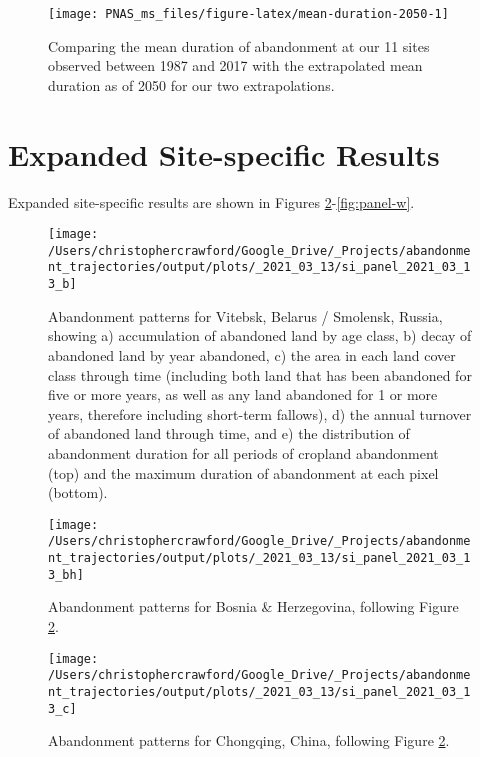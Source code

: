\documentclass[9pt,twocolumn,twoside,lineno]{pnas-new}
\begin{document}
\begin{figure}
\texttt{[image: PNAS\_ms\_files/figure-latex/mean-duration-2050-1]} \caption{Comparing the mean duration of abandonment at our 11 sites observed between 1987 and 2017 with the extrapolated mean duration as of 2050 for our two extrapolations.}\label{fig:mean-duration-2050}
\end{figure}

\hypertarget{expanded-site-specific-results}{%
\section{Expanded Site-specific Results}\label{expanded-site-specific-results}}

Expanded site-specific results are shown in Figures \ref{fig:panel-b}-\ref{fig:panel-w}.













\begin{figure}
\texttt{[image: /Users/christophercrawford/Google\_Drive/\_Projects/abandonment\_trajectories/output/plots/\_2021\_03\_13/si\_panel\_2021\_03\_13\_b]} \caption{Abandonment patterns for Vitebsk, Belarus / Smolensk, Russia, showing a) accumulation of abandoned land by age class, b) decay of abandoned land by year abandoned, c) the area in each land cover class through time (including both land that has been abandoned for five or more years, as well as any land abandoned for 1 or more years, therefore including short-term fallows), d) the annual turnover of abandoned land through time, and e) the distribution of abandonment duration for all periods of cropland abandonment (top) and the maximum duration of abandonment at each pixel (bottom).}\label{fig:panel-b}
\end{figure}

\begin{figure}
\texttt{[image: /Users/christophercrawford/Google\_Drive/\_Projects/abandonment\_trajectories/output/plots/\_2021\_03\_13/si\_panel\_2021\_03\_13\_bh]} \caption{Abandonment patterns for Bosnia \& Herzegovina, following Figure \ref{fig:panel-b}.}\label{fig:panel-bh}
\end{figure}

\begin{figure}
\texttt{[image: /Users/christophercrawford/Google\_Drive/\_Projects/abandonment\_trajectories/output/plots/\_2021\_03\_13/si\_panel\_2021\_03\_13\_c]} \caption{Abandonment patterns for Chongqing, China, following Figure \ref{fig:panel-b}.}\label{fig:panel-c}
\end{figure}
\end{document}

